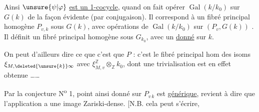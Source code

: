 Ainsi $\unsure{\psi|\varphi}$ \uline{est un 1-cocycle}, quand on fait opérer $\operatorname{Gal}(k/k_0)$ sur $G(k)$ de la façon évidente (par conjugaison). Il correspond à un fibré principal homogène $P_{v,k}$ sous $G(k)$, avec opérations de $\operatorname{Gal}(k/k_0)$ sur $(P_v,G(k))$ . Il définit  un fibré principal homogène  sous $G_{k_0}$, avec un \uline{ donné} sur $k$.

On peut d'ailleurs dire ce que c'est que $P$ : c'est le fibré principal hom des isoms  $\xi_{M,\deleted{\unsure{k}}\infty}$ avec $\xi_{M,v}^{\mathbb Z}\otimes_{\mathbb Z} k_0$, dont une trivialisation est en effet obtenue \ldots\ldots

Par la conjecture  N\textsuperscript{o} 1,   point ainsi donné sur $P_{v\,k}$ est \uline{générique}, revient à dire que l'application
 a une image Zariski-dense. [N.B. cela peut s'écrire,
